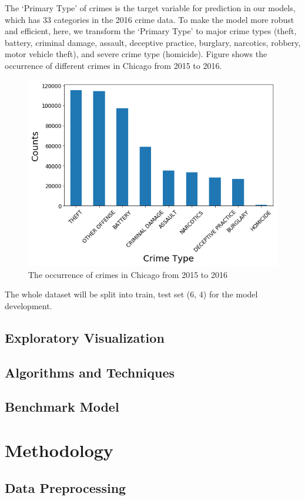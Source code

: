 \documentclass[12pt]{article}
\begin{document}
    The ‘Primary Type’ of crimes is the target variable for prediction in our models, which has 33 categories in the 2016 crime data. To make the model more robust and efficient, here, we transform the ‘Primary Type’ to major crime types (theft, battery, criminal damage, assault, deceptive practice, burglary, narcotics, robbery, motor vehicle theft), and severe crime type (homicide). Figure shows the occurrence of different crimes in Chicago from 2015 to 2016.
\begin{figure}[h]
\includegraphics[scale=0.5]{figure/total_crime.png}
\centering
\caption{The occurrence of crimes in Chicago from 2015 to 2016}
\end{figure}
  
  
The whole dataset will be split into train, test set (6, 4) for the model development.
\subsection{Exploratory Visualization}
\subsection{Algorithms and Techniques}
\subsection{Benchmark Model}
\section{Methodology}
\subsection{Data Preprocessing}
\end{document}
